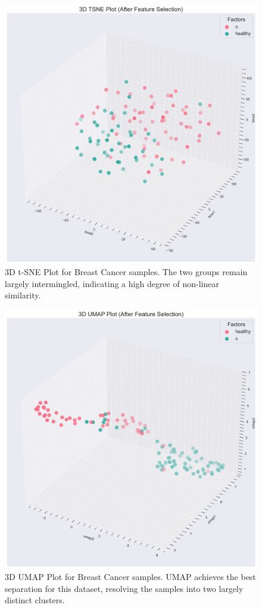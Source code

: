 \documentclass[journal]{IEEEtran}
\begin{document}
\begin{figure}[htbp]
\centering
\includegraphics[width=\linewidth]{breast_cancer_figures/clustering/after_feature_selection/3D_tsne_plot.png}
\caption{3D t-SNE Plot for Breast Cancer samples. The two groups remain largely intermingled, indicating a high degree of non-linear similarity.}
\label{fig:breast_tsne}
\end{figure}

\begin{figure}[htbp]
\centering
\includegraphics[width=\linewidth]{breast_cancer_figures/clustering/after_feature_selection/3D_umap_plot.png}
\caption{3D UMAP Plot for Breast Cancer samples. UMAP achieves the best separation for this dataset, resolving the samples into two largely distinct clusters.}
\label{fig:breast_umap}
\end{figure}
\end{document}
